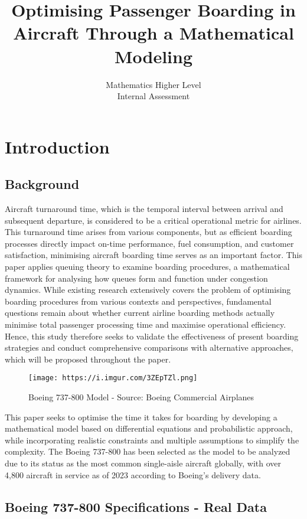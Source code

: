 \documentclass[12pt]{article}
\title{Optimising Passenger Boarding in Aircraft Through a Mathematical Modeling}
\author{Mathematics Higher Level\\Internal Assessment}
\date{}
\begin{document}
\maketitle
\thispagestyle{empty}
\newpage

\section{Introduction}
\subsection{Background}

Aircraft turnaround time, which is the temporal interval between arrival and subsequent departure, is considered to be a critical operational metric for airlines. This turnaround time arises from various components, but as efficient boarding processes directly impact on-time performance, fuel consumption, and customer satisfaction, minimising aircraft boarding time serves as an important factor. This paper applies queuing theory to examine boarding procedures, a mathematical framework for analysing how queues form and function under congestion dynamics. While existing research extensively covers the problem of optimising boarding procedures from various contexts and perspectives, fundamental questions remain about whether current airline boarding methods actually minimise total passenger processing time and maximise operational efficiency. Hence, this study therefore seeks to validate the effectiveness of present boarding strategies and conduct comprehensive comparisons with alternative approaches, which will be proposed throughout the paper.

\begin{figure}[H]
\centering
\texttt{[image: https://i.imgur.com/3ZEpTZl.png]}
\caption{Boeing 737-800 Model - Source: Boeing Commercial Airplanes}
\end{figure}

This paper seeks to optimise the time it takes for boarding by developing a mathematical model based on differential equations and probabilistic approach, while incorporating realistic constraints and multiple assumptions to simplify the complexity. The Boeing 737-800 has been selected as the model to be analyzed due to its status as the most common single-aisle aircraft globally, with over 4,800 aircraft in service as of 2023 according to Boeing's delivery data.

\subsection{Boeing 737-800 Specifications - Real Data}
\end{document}
